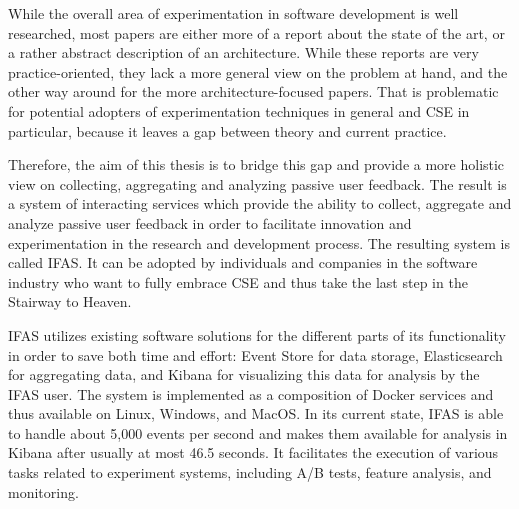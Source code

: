 While the overall area of experimentation in software development is well researched, most papers are either more of a report about the state of the art, or a rather abstract description of an architecture.
While these reports are very practice-oriented, they lack a more general view on the problem at hand, and the other way around for the more architecture-focused papers.
That is problematic for potential adopters of experimentation techniques in general and \ac{CSE} in particular, because it leaves a gap between theory and current practice.

Therefore, the aim of this thesis is to bridge this gap and provide a more holistic view on collecting, aggregating and analyzing passive user feedback.
%
The result is a system of interacting services which provide the ability to collect, aggregate and analyze passive user feedback in order to facilitate innovation and experimentation in the research and development process.
The resulting system is called \ac{IFAS}.
It can be adopted by individuals and companies in the software industry who want to fully embrace \ac{CSE} and thus take the last step in the Stairway to Heaven.

\ac{IFAS} utilizes existing software solutions for the different parts of its functionality in order to save both time and effort:
Event Store for data storage, Elasticsearch for aggregating data, and Kibana for visualizing this data for analysis by the \ac{IFAS} user.
The system is implemented as a composition of Docker services and thus available on Linux, Windows, and MacOS.
In its current state, \ac{IFAS} is able to handle about 5,000 events per second and makes them available for analysis in Kibana after usually at most 46.5 seconds.
It facilitates the execution of various tasks related to experiment systems, including A/B tests, feature analysis, and monitoring.

